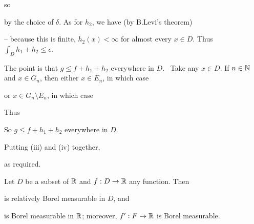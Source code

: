 {

\noindent so


\noindent by the choice of $\delta$.   As for $h_2$, we have
(by B.Levi's theorem)


\noindent -- because this is finite, $h_2(x)<\infty$ for almost every
$x\in D$.   Thus $\int_Dh_1+h_2\le\epsilon$.

\medskip

 The point is that $g\le f+h_1+h_2$ everywhere in
$D$.   \Prf\ Take any $x\in D$.   If $n\in\Bbb N$
and $x\in G_n$, then either $x\in E_n$, in which case


\noindent or $x\in G_n\setminus E_n$, in which case


\noindent Thus


\noindent So $g\le f+h_1+h_2$ everywhere in $D$.

\medskip

 Putting (iii) and (iv) together,


\noindent as required.
}%


 Let $D$ be a subset of $\Bbb R$ and
$f:D\to\Bbb R$ any function.   Then


\noindent is relatively Borel measurable in $D$, and


\noindent is Borel measurable in $\Bbb R$;  moreover, $f':F\to\Bbb R$ is
Borel measurable.

